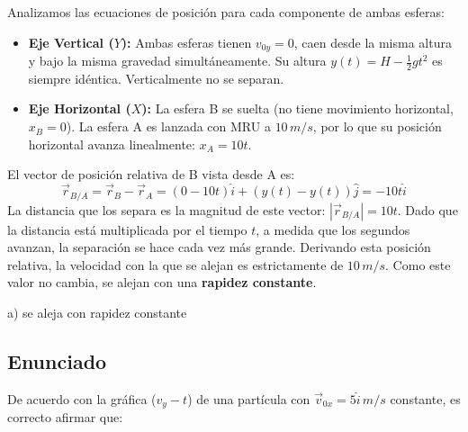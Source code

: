 \documentclass[12pt, a4paper]{article}
\begin{document}
Analizamos las ecuaciones de posición para cada componente de ambas esferas:
\begin{itemize}
    \item \textbf{Eje Vertical ($Y$):} Ambas esferas tienen $v_{0y} = 0$, caen desde la misma altura y bajo la misma gravedad simultáneamente. Su altura $y(t) = H - \frac{1}{2}gt^2$ es siempre idéntica. Verticalmente no se separan.
    \item \textbf{Eje Horizontal ($X$):} La esfera B se suelta (no tiene movimiento horizontal, $x_B = 0$). La esfera A es lanzada con MRU a $10\,\si{m/s}$, por lo que su posición horizontal avanza linealmente: $x_A = 10t$.
\end{itemize}

El vector de posición relativa de B vista desde A es:
$$ \vec{r}_{B/A} = \vec{r}_B - \vec{r}_A = (0 - 10t)\hat{i} + (y(t) - y(t))\hat{j} = -10t\hat{i} $$
La distancia que los separa es la magnitud de este vector: $|\vec{r}_{B/A}| = 10t$.
Dado que la distancia está multiplicada por el tiempo $t$, a medida que los segundos avanzan, la separación se hace cada vez más grande. Derivando esta posición relativa, la velocidad con la que se alejan es estrictamente de $10\,\si{m/s}$. Como este valor no cambia, se alejan con una \textbf{rapidez constante}.

\begin{tcolorbox}[colback=green!5!white, colframe=green!50!black, title=Respuesta Final]
\centering \Large a) se aleja con rapidez constante
\end{tcolorbox}

\newpage

\subsection*{Enunciado}
De acuerdo con la gráfica ($v_y - t$) de una partícula con $\vec{v}_{0x} = 5\hat{i} \,\si{m/s}$ constante, es correcto afirmar que:

\begin{center}
\end{center}
\end{document}
